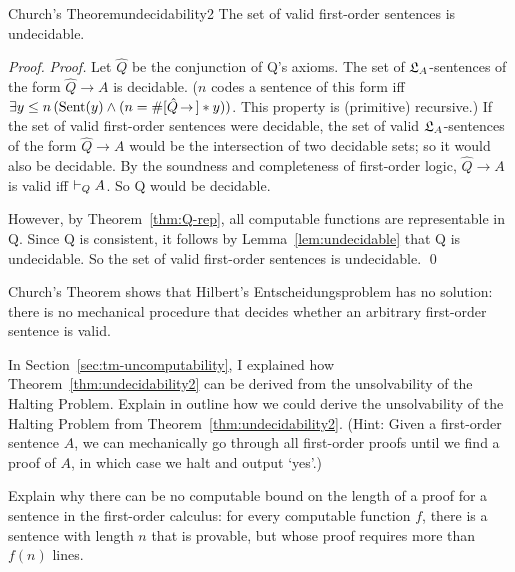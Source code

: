 \begin{theorem}{Church's Theorem}{undecidability2}
  The set of valid first-order sentences is undecidable.
\end{theorem}
\begin{proof}
  \emph{Proof.}
  Let $\hat{Q}$ be the conjunction of Q's axioms.
  The set of $\mathfrak{L}_A$-sentences of the form $\hat{Q} \to A$ is decidable.
  ($n$ codes a sentence of this form iff
  $\exists y \leq n\, (\mathrm{Sent}(y) \land (n = \gln{\hat{Q} \to} * y))$.
  This property is (primitive) recursive.)
  If the set of valid first-order sentences were decidable,
  the set of valid $\mathfrak{L}_A$-sentences of the form $\hat{Q} \to A$ would be the intersection of two decidable sets;
  so it would also be decidable.
  By the soundness and completeness of first-order logic,
  $\hat{Q} \to A$ is valid iff $\vdash_Q A$.
  So Q would be decidable.
  
  However,
  by Theorem~\ref{thm:Q-rep},
  all computable functions are representable in Q.
  Since Q is consistent,
  it follows by Lemma~\ref{lem:undecidable} that
  Q is undecidable.
  So the set of valid first-order sentences is undecidable.
  \qed
\end{proof}

Church's Theorem shows that Hilbert's Entscheidungsproblem has no solution:
there is no mechanical procedure that
decides whether an arbitrary first-order sentence is valid.

\begin{exercise}
    In Section~\ref{sec:tm-uncomputability},
    I explained how Theorem~\ref{thm:undecidability2} can be derived from
    the unsolvability of the Halting Problem.
    Explain in outline how we could derive the unsolvability of the Halting Problem
    from Theorem~\ref{thm:undecidability2}.
    (Hint: Given a first-order sentence $A$,
    we can mechanically go through all first-order proofs
    until we find a proof of $A$,
    in which case we halt and output `yes'.)
\end{exercise}

\begin{exercise}
  Explain why there can be no computable bound on the length of
  a proof for a sentence in the first-order calculus:
  for every computable function $f$,
  there is a sentence with length $n$ that is provable,
  but whose proof requires more than $f(n)$ lines.
\end{exercise}

